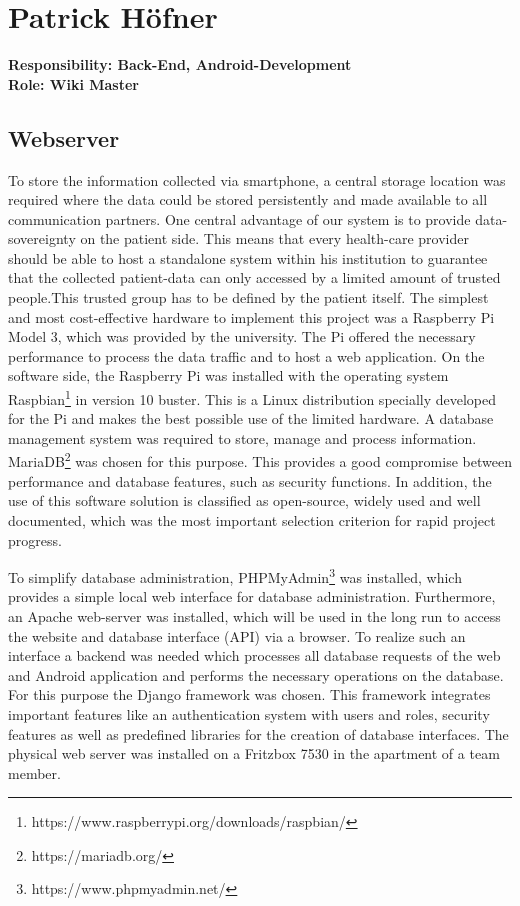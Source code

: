 \section{Patrick Höfner}
\textbf{Responsibility: Back-End, Android-Development}\\
\textbf{Role: Wiki Master}\\

\subsection{Webserver}

To store the information collected via smartphone, a central storage location was required where the data could be stored persistently and made available to all communication partners. One central advantage of our system is to provide data-sovereignty on the patient side. This means that every health-care provider should be able to host a standalone system within his institution to guarantee that the collected patient-data can only accessed by a limited amount of trusted people.This trusted group has to be defined by the patient itself. The simplest and most cost-effective hardware to implement this project was a Raspberry Pi Model 3, which was provided by the university.
The Pi offered the necessary performance to process the data traffic and to host a web application. On the software side, the Raspberry Pi was installed with the operating system Raspbian\footnote{https://www.raspberrypi.org/downloads/raspbian/} in version 10 \glqq{}buster\grqq{}. This is a Linux distribution specially developed for the Pi and makes the best possible use of the limited hardware. A database management system was required to store, manage and process information. MariaDB\footnote{https://mariadb.org/} was chosen for this purpose. This provides a good compromise between performance and database features, such as security functions. In addition, the use of this software solution is classified as \glqq{}open-source\grqq{}, widely used and well documented, which was the most important selection criterion for rapid project progress.

To simplify database administration, PHPMyAdmin\footnote{https://www.phpmyadmin.net/} was installed, which provides a simple local web interface for database administration. Furthermore, an Apache web-server was installed, which will be used in the long run to access the website and database interface (API) via a browser. To realize such an interface a backend was needed which processes all database requests of the web and Android application and performs the necessary operations on the database. For this purpose the Django framework was chosen. This framework integrates important features like an authentication system with users and roles, security features as well as predefined libraries for the creation of database interfaces. The physical web server was installed on a Fritzbox 7530 in the apartment of a team member. 

